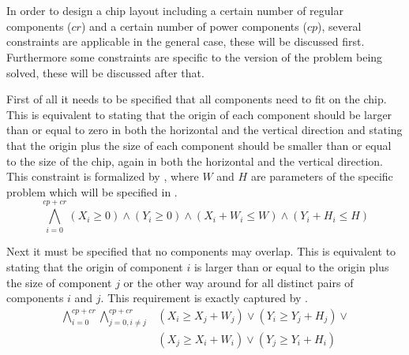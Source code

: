 \chapter{}
In order to design a chip layout including a certain number of regular components ($cr$) and a certain number of power components ($cp$), several constraints are applicable in the general case, these will be discussed first. Furthermore some constraints are specific to the version of the problem being solved, these will be discussed after that.

First of all it needs to be specified that all components need to fit on the chip. This is equivalent to stating that the origin of each component should be larger than or equal to zero in both the horizontal and the vertical direction and stating that the origin plus the size of each component should be smaller than or equal to the size of the chip, again in both the horizontal and the vertical direction. This constraint is formalized by , where $W$ and $H$ are parameters of the specific problem which will be specified in .
\begin{equation}
  \label{eqn:2_allfit}
  \bigwedge_{i = 0}^{cp + cr}
    (X_{i} \geq 0) \wedge
    (Y_{i} \geq 0) \wedge
    (X_{i} + W_{i} \leq W) \wedge
    (Y_{i} + H_{i} \leq H)
\end{equation}

Next it must be specified that no components may overlap. This is equivalent to stating that the origin of component $i$ is larger than or equal to the origin plus the size of component $j$ or the other way around for all distinct pairs of components $i$ and $j$. This requirement is exactly captured by .
\begin{equation}
  \label{eqn:2_overlap}
  \begin{aligned}
    \bigwedge_{i = 0}^{cp + cr}
      \bigwedge_{j = 0, i \neq j}^{cp + cr}
        &(X_{i} \geq X_{j} + W_{j}) \vee
         (Y_{i} \geq Y_{j} + H_{j}) \vee \\
        &(X_{j} \geq X_{i} + W_{i}) \vee
         (Y_{j} \geq Y_{i} + H_{i})
  \end{aligned}
\end{equation}

